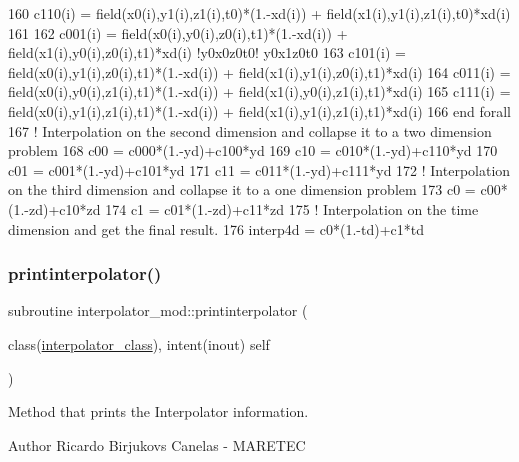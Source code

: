 \begin{DoxyCode}
160         c110(i) = field(x0(i),y1(i),z1(i),t0)*(1.-xd(i)) + field(x1(i),y1(i),z1(i),t0)*xd(i)
161 
162         c001(i) = field(x0(i),y0(i),z0(i),t1)*(1.-xd(i)) + field(x1(i),y0(i),z0(i),t1)*xd(i) \textcolor{comment}{!y0x0z0t0! 
       y0x1z0t0}
163         c101(i) = field(x0(i),y1(i),z0(i),t1)*(1.-xd(i)) + field(x1(i),y1(i),z0(i),t1)*xd(i)
164         c011(i) = field(x0(i),y0(i),z1(i),t1)*(1.-xd(i)) + field(x1(i),y0(i),z1(i),t1)*xd(i)
165         c111(i) = field(x0(i),y1(i),z1(i),t1)*(1.-xd(i)) + field(x1(i),y1(i),z1(i),t1)*xd(i)
166 \textcolor{keywordflow}{    end forall}
167     \textcolor{comment}{! Interpolation on the second dimension and collapse it to a two dimension problem}
168     c00 = c000*(1.-yd)+c100*yd
169     c10 = c010*(1.-yd)+c110*yd
170     c01 = c001*(1.-yd)+c101*yd
171     c11 = c011*(1.-yd)+c111*yd
172     \textcolor{comment}{! Interpolation on the third dimension and collapse it to a one dimension problem}
173     c0 = c00*(1.-zd)+c10*zd
174     c1 = c01*(1.-zd)+c11*zd
175     \textcolor{comment}{! Interpolation on the time dimension and get the final result.}
176     interp4d = c0*(1.-td)+c1*td
\end{DoxyCode}
\mbox{\label{namespaceinterpolator__mod_a9b149bc8a3da5d1864b8c049f8b00697}} 
\subsubsection{\texorpdfstring{printinterpolator()}{printinterpolator()}}
{\footnotesize\ttfamily subroutine interpolator\+\_\+mod\+::printinterpolator (\begin{DoxyParamCaption}\item[{class(\mbox{\hyperlink{structinterpolator__mod_1_1interpolator__class}{interpolator\+\_\+class}}), intent(inout)}]{self }\end{DoxyParamCaption})\hspace{0.3cm}{\ttfamily [private]}}



Method that prints the Interpolator information. 

\begin{DoxyAuthor}{Author}
Ricardo Birjukovs Canelas -\/ M\+A\+R\+E\+T\+EC 
\end{DoxyAuthor}


